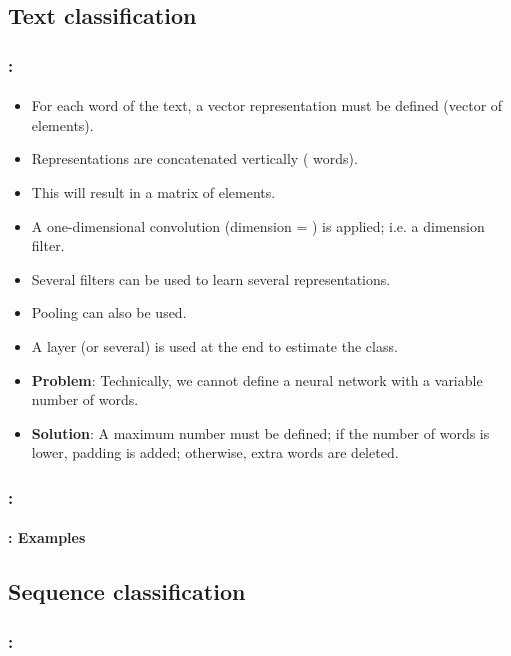\documentclass[xcolor=table]{beamer}
\begin{document}
\subsection{Text classification}

\begin{frame}
	\frametitle{\insertshortsubtitle: \insertsection}
	\framesubtitle{\insertsubsection}
	
	\begin{itemize}
			\item For each word of the text, a vector representation must be defined (vector of  elements).
			\item Representations are concatenated vertically ( words).
			\item This will result in a matrix of  elements.
			\item A one-dimensional convolution (dimension = ) is applied; i.e. a  dimension filter.
			\item Several filters can be used to learn several representations.
			\item Pooling can also be used.
			\item A  layer (or several) is used at the end to estimate the class.
			\item \textbf{Problem}: Technically, we cannot define a neural network with a variable number of words.
			\item \textbf{Solution}: \textcolor{yellow!30}{A maximum number must be defined; if the number of words is lower, padding is added; otherwise, extra words are deleted.}
		\end{itemize}
	
\end{frame}

\begin{frame}
	\frametitle{\insertshortsubtitle: \insertsection}
	\framesubtitle{\insertsubsection: Examples}
	
	
\end{frame}

\subsection{Sequence classification}

\begin{frame}
	\frametitle{\insertshortsubtitle: \insertsection}
	\framesubtitle{\insertsubsection}
	
	
\end{frame}
\end{document}
